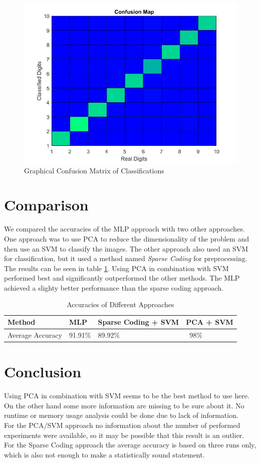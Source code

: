 \documentclass[paper=a4, fontsize=11pt]{scrartcl} %
\numberwithin{equation}{section} %
\numberwithin{figure}{section} %
\numberwithin{table}{section} %
\begin{document}
\begin{figure}[H]
	\centering
	\includegraphics[width = 0.6\linewidth]{./confusion.jpg}
	\caption{Graphical Confusion Matrix of Classifications}
	\label{fig:confusion}
\end{figure}

\section{Comparison}
We compared the accuracies of the MLP approach with two other approaches. One approach was to use PCA to reduce the dimensionality of the problem and then use an SVM to classify the images. The other approach also used an SVM for classification, but it used a method named \textit{Sparse Coding} for preprocessing.\\
The results can be seen in table \ref{tab:comparison}.
Using PCA in combination with SVM performed best and significantly outperformed the other methods.
The MLP achieved a slighty better performance than the sparse coding approach.


\begin{table}[H]
\centering
\caption{Accuracies of Different Approaches}
\label{tab:comparison}
\begin{tabular}{l|lll}
Method & MLP & Sparse Coding + SVM & PCA + SVM \\ \hline
Average Accuracy & 91.91\% & 89.92\% & ~98\%
\end{tabular}
\end{table}

\section{Conclusion}
Using PCA in combination with SVM seems to be the best method to use here. On the other hand some more information are missing to be sure about it. No runtime or memory usage analysis could be done due to lack of information.\\
For the PCA/SVM approach no information about the number of performed experiments were available, so it may be possible that this result is an outlier. For the Sparse Coding approach the average accuracy is based on three runs only, which is also not enough to make a statistically sound statement.
\end{document}
